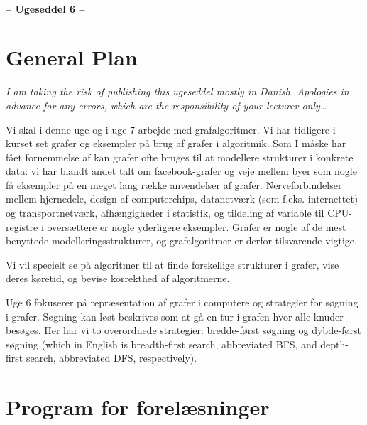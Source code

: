 \documentclass[12pt,a4paper]{article}
\theoremstyle{plain}
\theoremstyle{definition}
\begin{document}
\begin{center}
\textbf{\large \coursenameshort \\[0.5em] -- Ugeseddel 6 -- \\[0.5em]}
\end{center}
\noindent

\section*{General Plan}

\emph{%
  I am taking the risk of publishing this ugeseddel mostly in
  Danish. Apologies in advance for any errors, which are the
  responsibility of your lecturer only\ldots 
}


Vi skal i denne uge og i uge 7 arbejde med grafalgoritmer. 
Vi har tidligere i kurset set grafer og eksempler på brug af grafer i
algoritmik. Som I måske har fået  fornemmelse af kan grafer ofte
bruges til at modellere strukturer i konkrete data: vi har blandt
andet talt om facebook-grafer og veje mellem byer som nogle få
eksempler på en meget lang række anvendelser af
grafer. Nerveforbindelser mellem hjernedele, design af computerchips,
datanetværk (som f.eks. internettet) og transportnetværk,
afhængigheder i statistik, og tildeling af variable til CPU-registre i
oversættere er nogle yderligere eksempler. Grafer er nogle af de mest
benyttede modelleringsstrukturer, og grafalgoritmer er derfor
tilsvarende vigtige.

Vi vil specielt se på algoritmer til at finde forskellige strukturer i
grafer, vise deres køretid, og bevise korrekthed af algoritmerne.

Uge 6 fokuserer på repræsentation af grafer i computere og strategier
for søgning i grafer. Søgning kan løst beskrives som at gå en tur i
grafen hvor alle knuder besøges. Her har vi to overordnede strategier:
bredde-først søgning og dybde-først søgning
(which in English is
breadth-first search, abbreviated BFS, and
depth-first search, abbreviated DFS, respectively).

%   
%   

\section*{Program for forelæsninger}
\end{document}
